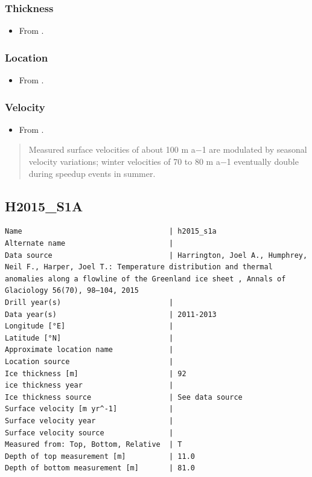 \documentclass[article,a4paper,times,11pt,twoside]{article}
\begin{document}
\subsubsection{Thickness}
\label{sec:orgb899ffc}

\begin{itemize}
\item From \textcite{ryser_2014_caterpillar}.
\end{itemize}

\subsubsection{Location}
\label{sec:org45f53cd}

\begin{itemize}
\item From \textcite{ryser_2014_caterpillar}.
\end{itemize}

\subsubsection{Velocity}
\label{sec:orgbad3e2c}

\begin{itemize}
\item From \textcite{ryser_2014_caterpillar}.
\end{itemize}

\begin{quote}
Measured surface velocities of about 100 m a−1 are
modulated by seasonal velocity variations; winter
velocities of 70 to 80 m a−1 eventually double during
speedup events in summer. 
\end{quote}
\clearpage
\subsection{H2015\_S1A}
\label{sec:orge5bd596}
\begin{verbatim}
Name                                  | h2015_s1a
Alternate name                        | 
Data source                           | Harrington, Joel A., Humphrey, Neil F., Harper, Joel T.: Temperature distribution and thermal anomalies along a flowline of the Greenland ice sheet , Annals of Glaciology 56(70), 98–104, 2015 
Drill year(s)                         | 
Data year(s)                          | 2011-2013
Longitude [°E]                        | 
Latitude [°N]                         | 
Approximate location name             | 
Location source                       | 
Ice thickness [m]                     | 92
ice thickness year                    | 
Ice thickness source                  | See data source
Surface velocity [m yr^-1]            | 
Surface velocity year                 | 
Surface velocity source               | 
Measured from: Top, Bottom, Relative  | T
Depth of top measurement [m]          | 11.0
Depth of bottom measurement [m]       | 81.0
\end{verbatim}
\end{document}
